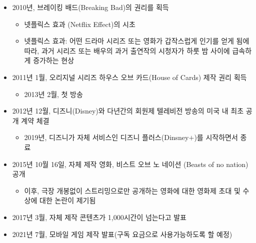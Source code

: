 \begin{itemize}
\begin{itemize}
\begin{itemize}
		\end{itemize}
	\item 2010년, 브레이킹 배드(Breaking Bad)의 권리를 획득 
		\begin{itemize}
		\item 넷플릭스 효과 (Netflix Effect)의 시초
		\item 넷플릭스 효과: 어떤 드라마 시리즈 또는 영화가 갑작스럽게 인기를 얻게 됨에 따라, 과거 시리즈 또는 배우의 과거 출연작의 시청자가 하룻 밤 사이에 급속하게 증가하는 현상
		\end{itemize}
	\item 2011년 1월, 오리지널 시리즈 하우스 오브 카드(House of Cards)	 제작 권리 획득
		\begin{itemize}
		\item 2013년 2월, 첫 방송
		\end{itemize}
	\item 2012년 12월, 디즈니(Disney)와 다년간의 회원제 텔레비전 방송의 미국 내 최초 공개 계약 체결
		\begin{itemize}
		\item 2019년, 디즈니가 자체 서비스인 디즈니 플러스(Dinsney$+$)를 시작하면서 종료
		\end{itemize}
	\item 2015년 10월 16일, 자체 제작 영화, 비스트 오브 노 네이션 (Beasts of no nation) 공개
		\begin{itemize}
		\item 이후, 극장 개봉없이 스트리밍으로만 공개하는 영화에 대한 영화제 초대 및 수상에 대한 논란이 제기됨
		\end{itemize}
	\item 2017년 3월, 자체 제작 콘텐츠가 1,000시간이 넘는다고 발표
	\item 2021년 7월, 모바일 게임 제작 발표(구독 요금으로 사용가능하도록 할 예정)		
	\end{itemize}


\end{itemize}
